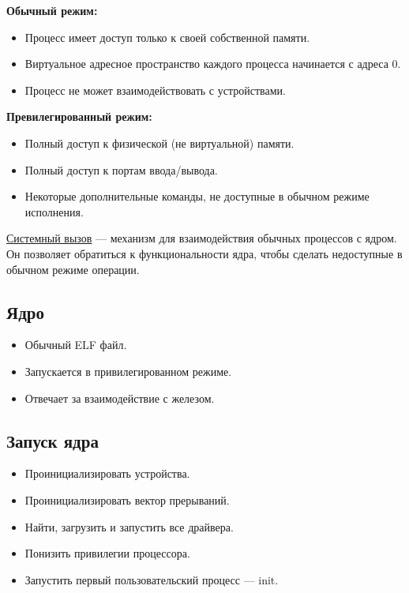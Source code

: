 \textbf{Обычный режим:}
\begin{itemize}
	\item Процесс имеет доступ только к своей собственной памяти.
	\item Виртуальное адресное пространство каждого процесса начинается с адреса 0.
	\item Процесс не может взаимодействовать с устройствами.
\end{itemize}

\textbf{Превилегированный режим:}
\begin{itemize}
	\item Полный доступ к физической (не виртуальной) памяти.
	\item Полный доступ к портам ввода/вывода.
	\item Некоторые дополнительные команды, не доступные в обычном режиме исполнения.
\end{itemize}

\begin{Def}
	\underline{Системный вызов} --- механизм для взаимодействия обычных процессов с ядром. 
	Он позволяет обратиться к функциональности ядра, чтобы сделать недоступные в обычном
	режиме операции.
\end{Def}

\subsection{Ядро}

\begin{itemize}
	\item Обычный ELF файл.
	\item Запускается в привилегированном режиме.
	\item Отвечает за взаимодействие с железом.
\end{itemize}

\subsection{Запуск ядра}

\begin{itemize}
	\item Проинициализировать устройства.
	\item Проинициализировать вектор прерываний.
	\item Найти, загрузить и запустить все драйвера.
	\item Понизить привилегии процессора.
	\item Запустить первый пользовательский процесс --- init.
\end{itemize}

